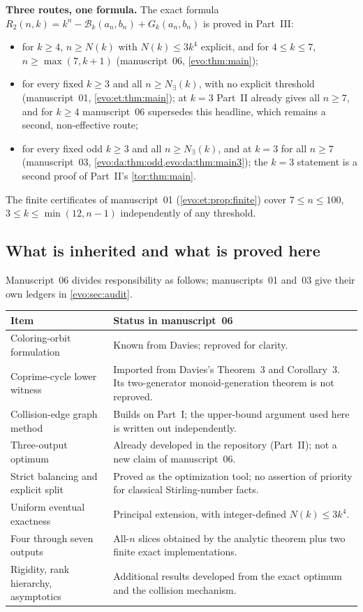 \documentclass[11pt,a4paper]{article}
\numberwithin{equation}{section}
\theoremstyle{definition}
\theoremstyle{remark}
\newcommand{\Bip}{\mathcal B}
\begin{document}
\begin{resultbox}
\textbf{Three routes, one formula.} The exact formula
$R_2(n,k)=k^n-\Bip_k(a_n,b_n)+G_k(a_n,b_n)$ is proved in Part~III:
\begin{itemize}
\item for $k\ge4$, $n\ge N(k)$ with $N(k)\le3k^4$ explicit, and for
 $4\le k\le7$, $n\ge\max(7,k+1)$ (manuscript~06, \cref{evo:thm:main});
\item for every fixed $k\ge3$ and all $n\ge N_\exists(k)$, with no explicit
 threshold (manuscript~01, \cref{evo:et:thm:main}); at $k=3$ Part~II already
 gives all $n\ge7$, and for $k\ge4$ manuscript~06 supersedes this headline,
 which remains a second, non-effective route;
\item for every fixed odd $k\ge3$ and all $n\ge N_\exists(k)$, and at $k=3$
 for all $n\ge7$ (manuscript~03, \cref{evo:da:thm:odd,evo:da:thm:main3}); the
 $k=3$ statement is a second proof of Part~II's \cref{tor:thm:main}.
\end{itemize}
The finite certificates of manuscript~01 (\cref{evo:et:prop:finite}) cover
$7\le n\le100$, $3\le k\le\min(12,n-1)$ independently of any threshold.
\end{resultbox}

\subsection{What is inherited and what is proved here}\label{evo:sec:inherited}

Manuscript~06 divides responsibility as follows; manuscripts~01 and~03 give
their own ledgers in \cref{evo:sec:audit}.

\begin{center}
\small
\begin{tabular}{@{}p{}p{}@{}}
\toprule
Item & Status in manuscript~06\\
\midrule
Coloring-orbit formulation & Known from Davies; reproved for clarity.\\
Coprime-cycle lower witness & Imported from Davies's Theorem~3 and
Corollary~3. Its two-generator monoid-generation theorem is not reproved.\\
Collision-edge graph method & Builds on Part~I; the upper-bound argument used
here is written out independently.\\
Three-output optimum & Already developed in the repository (Part~II); not a
new claim of manuscript~06.\\
Strict balancing and explicit split & Proved as the optimization tool; no
assertion of priority for classical Stirling-number facts.\\
Uniform eventual exactness & Principal extension, with integer-defined
$N(k)\le3k^4$.\\
Four through seven outputs & All-$n$ slices obtained by the analytic theorem
plus two finite exact implementations.\\
Rigidity, rank hierarchy, asymptotics & Additional results developed from the
exact optimum and the collision mechanism.\\
\bottomrule
\end{tabular}
\end{center}
\end{document}
